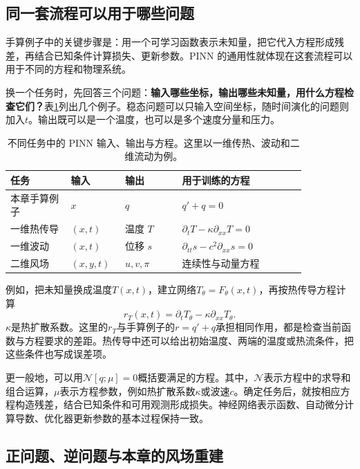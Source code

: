 \subsection{同一套流程可以用于哪些问题}
\label{sec:pinn-generality}
手算例子中的关键步骤是：用一个可学习函数表示未知量，把它代入方程形成残差，再结合已知条件计算损失、更新参数。PINN 的通用性就体现在这套流程可以用于不同的方程和物理系统\cite{raissi2019pinn,wang2023expert}。

换一个任务时，先回答三个问题：\textbf{输入哪些坐标，输出哪些未知量，用什么方程检查它们？}表\ref{tab:pinn-general-problems}列出几个例子。稳态问题可以只输入空间坐标，随时间演化的问题则加入$t$。输出既可以是一个温度，也可以是多个速度分量和压力。

\begin{table}[htbp]
\centering\small
\caption{不同任务中的 PINN 输入、输出与方程。这里以一维传热、波动和二维流动为例。}
\label{tab:pinn-general-problems}
\begin{tabular}{p{0.18\linewidth}p{0.13\linewidth}p{0.17\linewidth}p{0.37\linewidth}}
\toprule
任务 & 输入 & 输出 & 用于训练的方程\\
\midrule
本章手算例子 & $x$ & $q$ & $q'+q=0$\\
一维热传导 & $(x,t)$ & 温度 $T$ & $\partial_tT-\kappa\partial_{xx}T=0$\\
一维波动 & $(x,t)$ & 位移 $s$ & $\partial_{tt}s-c^2\partial_{xx}s=0$\\
二维风场 & $(x,y,t)$ & $u,v,\pi$ & 连续性与动量方程\\
\bottomrule
\end{tabular}
\end{table}

例如，把未知量换成温度$T(x,t)$，建立网络$T_\theta=F_\theta(x,t)$，再按热传导方程计算
\begin{equation}
 r_T(x,t)=\partial_tT_\theta-\kappa\partial_{xx}T_\theta.
 \label{eq:pinn-generic-heat-residual}
\end{equation}
$\kappa$是热扩散系数。这里的$r_T$与手算例子的$r=q'+q$承担相同作用，都是检查当前函数与方程要求的差距。热传导中还可以给出初始温度、两端的温度或热流条件，把这些条件也写成误差项。

更一般地，可以用$\mathcal N[q;\mu]=0$概括要满足的方程。其中，$\mathcal N$表示方程中的求导和组合运算，$\mu$表示方程参数，例如热扩散系数$\kappa$或波速$c$。确定任务后，就按相应方程构造残差，结合已知条件和可用观测形成损失。神经网络表示函数、自动微分计算导数、优化器更新参数的基本过程保持一致。

\subsection{正问题、逆问题与本章的风场重建}
